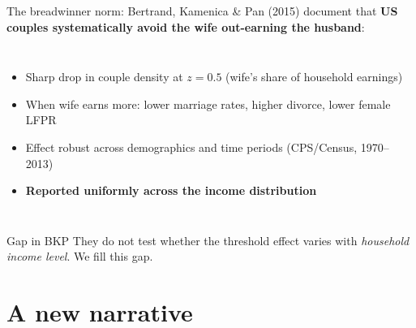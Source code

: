\documentclass[10pt,aspectratio=169]{beamer}
\begin{document}
\begin{frame}{The breadwinner norm: Bertrand, Kamenica \& Pan (2015)}
  \citet{BertrandKamenicaPan2015} document that \textbf{US couples
  systematically avoid the wife out-earning the husband}:
  \begin{columns}[c]
      \begin{itemize}
        \item Sharp drop in couple density at $z = 0.5$ (wife's share of
              household earnings)
        \item When wife earns more: lower marriage rates, higher divorce,
              lower female LFPR
        \item Effect robust across demographics and time periods
              (CPS/Census, 1970–2013)
        \item \textbf{Reported uniformly across the income distribution}
      \end{itemize}
  \end{columns}
  \medskip
  \begin{alertblock}{Gap in BKP}
    They do not test whether the threshold effect varies with
    \emph{household income level}. We fill this gap.
  \end{alertblock}
\end{frame}

\section{A new narrative}
\end{document}
